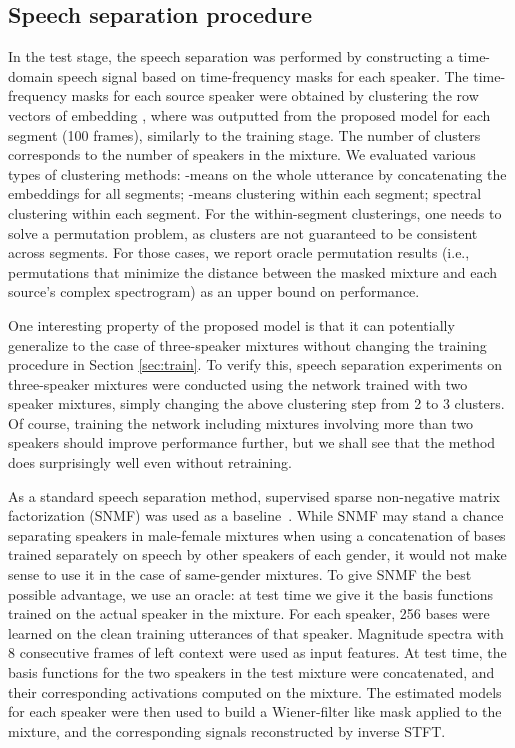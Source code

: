 \documentclass[9pt]{article} \usepackage{nips15submit_e,times}
\begin{document}
\subsection{Speech separation procedure}
In the test stage, the speech separation was performed by constructing a time-domain speech signal based on time-frequency masks for each speaker.
The time-frequency masks for each source speaker were obtained by clustering the row vectors of embedding , where  was outputted from the proposed model for each segment (100 frames), similarly to the training stage.
The number of clusters corresponds to the number of speakers in the mixture.
We evaluated various types of clustering methods: -means on the whole utterance by concatenating the embeddings  for all segments; -means clustering within each segment; spectral clustering within each segment. For the within-segment clusterings, one needs to solve a permutation problem, as clusters are not guaranteed to be consistent across segments. For those cases, we report oracle permutation results (i.e., permutations that minimize the  distance between the masked mixture and each source's complex spectrogram) as an upper bound on performance.


One interesting property of the proposed model is that it can potentially generalize to the case of three-speaker mixtures without changing the training procedure in Section \ref{sec:train}.
To verify this, speech separation experiments on three-speaker mixtures were conducted using the network trained with two speaker mixtures, simply changing the above clustering step from 2 to 3 clusters. Of course, training the network including mixtures involving more than two speakers should improve performance further, but we shall see that the method does surprisingly well even without retraining.

As a standard speech separation method, supervised sparse non-negative matrix factorization (SNMF) was used as a  baseline~\cite{LeRoux2015SparseNMF03}. While SNMF may stand a chance separating speakers in male-female mixtures when using a concatenation of bases trained separately on speech by other speakers of each gender, it would not make sense to use it in the case of same-gender mixtures. To give SNMF the best possible advantage, we use an oracle: at test time we give it the basis functions trained on the actual speaker in the mixture. For each speaker, 256 bases were learned on the clean training utterances of that speaker. Magnitude spectra with 8 consecutive frames of left context were used as input features. At test time, the basis functions for the two speakers in the test mixture were concatenated, and their corresponding activations computed on the mixture. The estimated models for each speaker were then used to build a Wiener-filter like mask applied to the mixture, and the corresponding signals reconstructed by inverse STFT.
\end{document}
